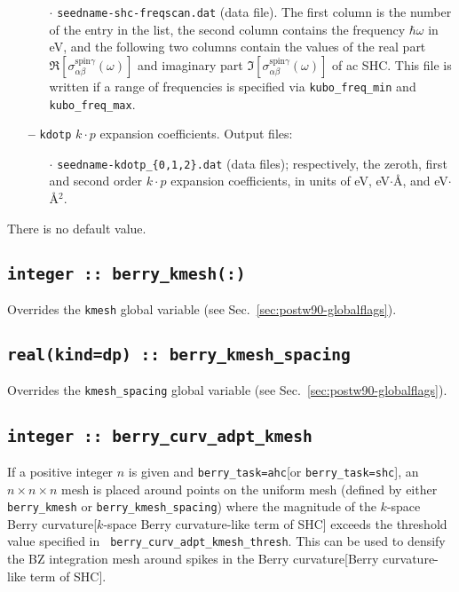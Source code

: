 \begin{itemize}
\begin{itemize}
	\item[$\cdot$] {\tt seedname-shc-freqscan.dat} (data file). The
	first column is the number of the entry in the list, the second column contains the frequency $\hbar\omega$ in eV, and the
	following two columns contain the values of the real part 
	$\Re[\sigma_{\alpha\beta}^{\text{spin}\gamma}(\omega)]$ and imaginary part $\Im[\sigma_{\alpha\beta}^{\text{spin}\gamma}(\omega)]$ of ac SHC.  This file is written if a range of
	frequencies is specified via {\tt kubo\_freq\_min} and {\tt
		kubo\_freq\_max}. 
	
	\end{itemize}

\item[{\bf --}] \verb#kdotp# $k\cdot p$ expansion coefficients. Output files:

\begin{itemize}

\item[$\cdot$] {\tt seedname-kdotp\_{\{0,1,2\}.dat}}
  (data files);  respectively, the zeroth, first and second order $k\cdot p$ expansion coefficients,
  in units of eV, eV$\cdot$\AA, and  eV$\cdot$\AA$^{2}$.
  
\end{itemize}

\end{itemize}
There is no default value.


\subsection[berry\_kmesh]{\tt integer :: berry\_kmesh(:)}
Overrides the \verb#kmesh# global variable (see
Sec.~\ref{sec:postw90-globalflags}).

\subsection[berry\_kmesh\_spacing]{\tt real(kind=dp) ::
  berry\_kmesh\_spacing}
Overrides the \verb#kmesh_spacing# global variable (see
Sec.~\ref{sec:postw90-globalflags}).


\subsection[berry\_adpt\_kmesh]{\tt integer :: berry\_curv\_adpt\_kmesh}
If a positive integer $n$ is given and {\tt berry\_task=ahc}[or {\tt berry\_task=shc}], an
$n\times n\times n$ mesh is placed around points on the uniform mesh
(defined by either {\tt berry\_kmesh} or {\tt berry\_kmesh\_spacing})
where the magnitude of the $k$-space Berry curvature[$k$-space Berry curvature-like term of SHC] exceeds the
threshold value specified in {\tt
  berry\_curv\_adpt\_kmesh\_thresh}. This can be used to densify the
BZ integration mesh around spikes in the Berry curvature[Berry curvature-like term of SHC].

